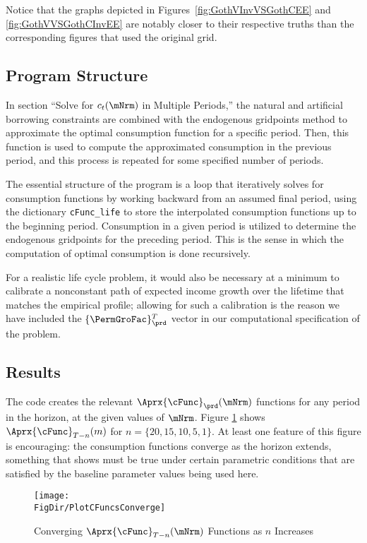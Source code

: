 \documentclass[\econtexRoot/SolvingMicroDSOPs]{subfiles}
\begin{document}
Notice that the graphs depicted in Figures~\ref{fig:GothVInvVSGothCEE} and \ref{fig:GothVVSGothCInvEE} are notably closer to their respective truths than the corresponding figures that used the original grid.

\subsection{Program Structure}

In section ``Solve for $c_t(\mNrm)$ in Multiple Periods,'' the natural and artificial borrowing constraints are combined with the endogenous gridpoints method to approximate the optimal consumption function for a specific period. Then, this function is used to compute the approximated consumption in the previous period, and this process is repeated for some specified number of periods.

The essential structure of the program is a loop that iteratively solves for consumption functions by working backward from an assumed final period, using the dictionary \texttt{cFunc\_life} to store the interpolated consumption functions up to the beginning period. Consumption in a given period is utilized to determine the endogenous gridpoints for the preceding period. This is the sense in which the computation of optimal consumption is done recursively.

For a realistic life cycle problem, it would also be necessary at a
minimum to calibrate a nonconstant path of expected income growth over the
lifetime that matches the empirical profile; allowing for such
a calibration is the reason we have included the $\{\PermGroFac\}_{\prd}^{T}$
vector in our computational specification of the problem.

\hypertarget{results}{}
\subsection{Results}

The code creates the relevant $\Aprx{\cFunc}_{\prd}(\mNrm)$ functions for any period in the horizon, at the given values of $\mNrm$.  Figure \ref{fig:PlotCFuncsConverge} shows $\Aprx{\cFunc}_{T-n}(m)$ for $n=\{20,15,10,5,1\}$.  At least one feature of this figure is encouraging: the consumption functions converge as the horizon extends, something that \cite{BufferStockTheory} shows must be true under certain parametric conditions that are satisfied by the baseline parameter values being used here.

\hypertarget{PlotCFuncsConverge}{}
\begin{figure}
  \texttt{[image: \\FigDir/PlotCFuncsConverge]}
  \caption{Converging $\Aprx{\cFunc}_{T-n}(\mNrm)$ Functions as $n$ Increases}
  \label{fig:PlotCFuncsConverge}
\end{figure}
\end{document}
